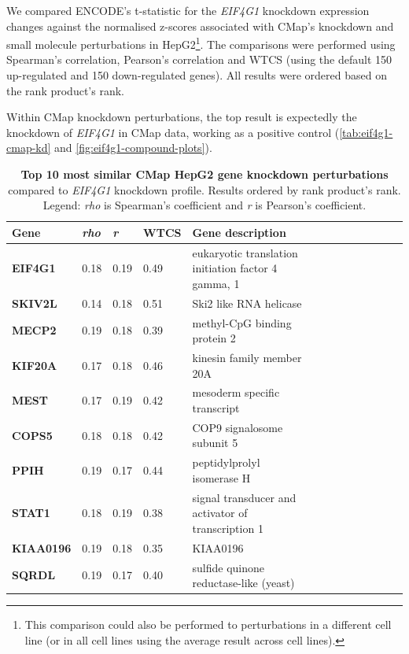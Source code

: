 We compared ENCODE's t-statistic for the \emph{EIF4G1} knockdown expression changes against the normalised z-scores associated with CMap's knockdown and small molecule perturbations in HepG2\footnote{This comparison could also be performed to perturbations in a different cell line (or in all cell lines using the average result across cell lines).}. The comparisons were performed using Spearman's correlation, Pearson's correlation and WTCS (using the default 150 up-regulated and 150 down-regulated genes). All results were ordered based on the rank product's rank.

Within CMap knockdown perturbations, the top result is expectedly the knockdown of \emph{EIF4G1} in CMap data, working as a positive control (\autoref{tab:eif4g1-cmap-kd} and \autoref{fig:eif4g1-compound-plots}).

\begin{table}[!ht]
\centering
\footnotesize
\caption[Top 10 CMap HepG2 gene knockdown perturbations]{\textbf{Top 10 most similar CMap HepG2 gene knockdown perturbations} compared to \emph{EIF4G1} knockdown profile. Results ordered by rank product's rank. Legend: \emph{rho} is Spearman's coefficient and \emph{r} is Pearson's coefficient.}
\label{tab:eif4g1-cmap-kd}
\begin{tabular}{lllllllllllll}
\toprule
\textbf{Gene}     & \textbf{\emph{rho}} & \textbf{\emph{r}} & \textbf{WTCS} & \textbf{Gene description}                           \\
\midrule
\textbf{EIF4G1}   & 0.18         & 0.19       & 0.49          & eukaryotic translation initiation factor 4 gamma, 1 \\
\textbf{SKIV2L}   & 0.14         & 0.18       & 0.51          & Ski2 like RNA helicase                              \\
\textbf{MECP2}    & 0.19         & 0.18       & 0.39          & methyl-CpG binding protein 2                        \\
\textbf{KIF20A}   & 0.17         & 0.18       & 0.46          & kinesin family member 20A                           \\
\textbf{MEST}     & 0.17         & 0.19       & 0.42          & mesoderm specific transcript                        \\
\textbf{COPS5}    & 0.18         & 0.18       & 0.42          & COP9 signalosome subunit 5                          \\
\textbf{PPIH}     & 0.19         & 0.17       & 0.44          & peptidylprolyl isomerase H                          \\
\textbf{STAT1}    & 0.18         & 0.19       & 0.38          & signal transducer and activator of transcription 1  \\
\textbf{KIAA0196} & 0.19         & 0.18       & 0.35          & KIAA0196                                            \\
\textbf{SQRDL}    & 0.19         & 0.17       & 0.40          & sulfide quinone reductase-like (yeast)             \\
\bottomrule
\end{tabular}
\end{table}

